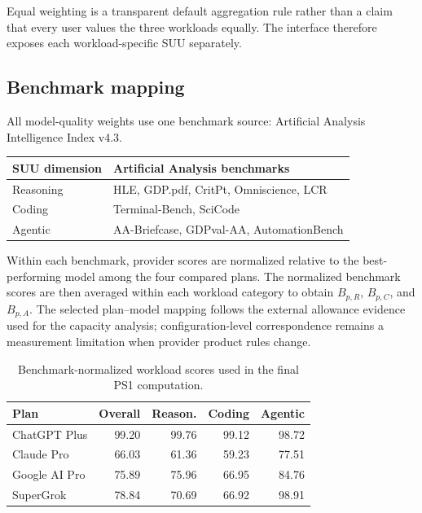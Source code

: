 \documentclass[sigconf,nonacm]{acmart}
\begin{document}
Equal weighting is a transparent default aggregation rule rather than a
claim that every user values the three workloads equally.
The interface therefore exposes each workload-specific SUU separately.


\subsection{Benchmark mapping}

All model-quality weights use one benchmark source:
Artificial Analysis Intelligence Index v4.3.

\vspace{0.4em}

\begin{center}

\begin{tabular}{ll}

\toprule

\textbf{SUU dimension}
&
\textbf{Artificial Analysis benchmarks}
\\

\midrule

Reasoning
&
HLE, GDP.pdf, CritPt, Omniscience, LCR
\\

Coding
&
Terminal-Bench, SciCode
\\

Agentic
&
AA-Briefcase, GDPval-AA, AutomationBench
\\

\bottomrule

\end{tabular}

\end{center}

\vspace{0.4em}

Within each benchmark, provider scores are normalized relative to the
best-performing model among the four compared plans. The normalized benchmark
scores are then averaged within each workload category to obtain
$B_{p,R}$, $B_{p,C}$, and $B_{p,A}$.
The selected plan--model mapping follows the external allowance evidence used
for the capacity analysis; configuration-level correspondence remains a
measurement limitation when provider product rules change.

\vspace{0.4em}

\begin{table}[H]
\centering
\caption{Benchmark-normalized workload scores used in the final PS1 computation.}
\begin{tabular}{lrrrr}
\toprule
\textbf{Plan} & \textbf{Overall} & \textbf{Reason.} &
\textbf{Coding} & \textbf{Agentic} \\
\midrule
ChatGPT Plus   & 99.20 & 99.76 & 99.12 & 98.72 \\
Claude Pro     & 66.03 & 61.36 & 59.23 & 77.51 \\
Google AI Pro  & 75.89 & 75.96 & 66.95 & 84.76 \\
SuperGrok      & 78.84 & 70.69 & 66.92 & 98.91 \\
\bottomrule
\end{tabular}
\end{table}
\end{document}
